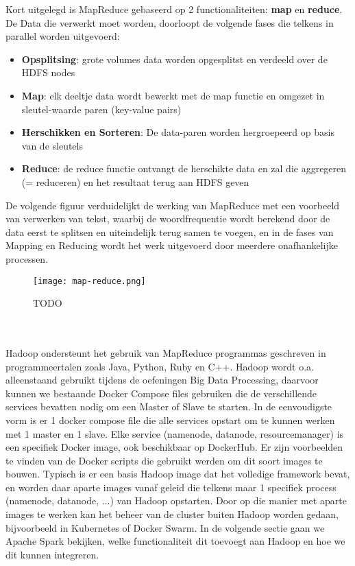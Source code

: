Kort uitgelegd is MapReduce gebaseerd op 2 functionaliteiten: \textbf{map} en \textbf{reduce}.
\newline
\newline
De Data die verwerkt moet worden, doorloopt de volgende fases die telkens in parallel worden uitgevoerd:
\begin{itemize}
    \item \textbf{Opsplitsing}: grote volumes data worden opgesplitst en verdeeld over de HDFS nodes
    \item \textbf{Map}: elk deeltje data wordt bewerkt met de map functie en omgezet in sleutel-waarde paren (key-value pairs)
    \item \textbf{Herschikken en Sorteren}: De data-paren worden hergroepeerd op basis van de sleutels
    \item \textbf{Reduce}: de reduce functie ontvangt de herschikte data en zal die aggregeren (= reduceren) en het resultaat terug aan HDFS geven
\end{itemize}

De volgende figuur verduidelijkt de werking van MapReduce met een voorbeeld van verwerken van tekst, waarbij de woordfrequentie wordt berekend door de data eerst te splitsen en uiteindelijk terug samen te voegen, en in de fases van Mapping en Reducing wordt  het werk uitgevoerd door meerdere onafhankelijke processen.
\begin{figure}
    \texttt{[image: map-reduce.png]}
    \caption{TODO \autocite{Anushkakhatri2022}}
\end{figure}
\\
\\
Hadoop ondersteunt het gebruik van MapReduce programmas geschreven in programmeertalen zoals Java, Python, Ruby en C++.
\autocite{Taylor2023}
\newline
\newline
Hadoop wordt o.a. alleenstaand gebruikt tijdens de oefeningen Big Data Processing, daarvoor kunnen we bestaande Docker Compose files gebruiken die de verschillende services bevatten nodig om een Master of Slave te starten.
In de eenvoudigste vorm is er 1 docker compose file die alle services opstart om te kunnen werken met 1 master en 1 slave.
\newline
\newline
Elke service (namenode, datanode, resourcemanager) is een specifiek Docker image, ook beschikbaar op DockerHub. Er zijn voorbeelden te vinden van de Docker scripts die gebruikt werden om dit soort images te bouwen. Typisch is er een basis Hadoop image dat het volledige framework bevat, en worden daar aparte images vanaf geleid die telkens maar 1 specifiek process (namenode, datanode, ...) van Hadoop opstarten.
\newline
Door op die manier met aparte images te werken kan het beheer van de cluster buiten Hadoop worden gedaan, bijvoorbeeld in Kubernetes of Docker Swarm.
\newline
\newline
In de volgende sectie gaan we Apache Spark bekijken, welke functionaliteit dit toevoegt aan Hadoop en hoe we dit kunnen integreren.
\newline
\newline


